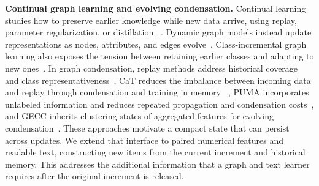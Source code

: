 \noindent\textbf{Continual graph learning and evolving condensation.}
Continual learning studies how to preserve earlier knowledge while new data
arrive, using replay, parameter regularization, or distillation
~\cite{icarl,ewc,lwf,continual_survey}. Dynamic graph models instead update
representations as nodes, attributes, and edges evolve~\cite{evolvegcn,tgn,
dynamic_survey}. Class-incremental graph learning also exposes the tension
between retaining earlier classes and adapting to new ones~\cite{qi2024}.
In graph condensation, replay methods address historical
coverage and class representativeness~\cite{dslr}, CaT reduces the imbalance
between incoming data and replay through condensation and training in memory
~\cite{cat}, PUMA incorporates unlabeled information and reduces repeated
propagation and condensation costs~\cite{puma}, and GECC inherits clustering
states of aggregated features for evolving condensation~\cite{gecc}. These
approaches motivate a compact state that can persist across updates. We extend
that interface to paired numerical features and readable text, constructing
new items from the current increment and historical memory. This addresses
the additional information that a graph and text learner requires after the
original increment is released.
